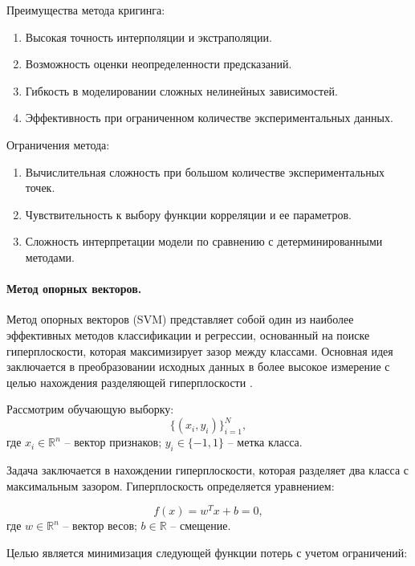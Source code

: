 Преимущества метода кригинга:

\begin{enumerate}
	\item Высокая точность интерполяции и экстраполяции.
	\item Возможность оценки неопределенности предсказаний.
	\item Гибкость в моделировании сложных нелинейных зависимостей.
	\item Эффективность при ограниченном количестве экспериментальных данных.
\end{enumerate}

Ограничения метода:

\begin{enumerate}
	\item Вычислительная сложность при большом количестве экспериментальных точек.
	\item Чувствительность к выбору функции корреляции и ее параметров.
	\item Сложность интерпретации модели по сравнению с детерминированными методами.
\end{enumerate}

\paragraph{Метод опорных векторов.}

Метод опорных векторов (SVM) представляет собой один из наиболее эффективных методов классификации и
регрессии, основанный на поиске гиперплоскости, которая максимизирует зазор между классами.
Основная идея заключается в преобразовании исходных данных в более
высокое измерение с целью нахождения разделяющей гиперплоскости \cite{Jakkula2006}.

Рассмотрим обучающую выборку:
\begin{equation}
	\{(x_i, y_i)\}_{i=1}^N,
\end{equation}
где $x_i \in \mathbb{R}^n$ -- вектор признаков;
$y_i \in \{-1, 1\}$ -- метка класса.

Задача заключается в нахождении гиперплоскости,
которая разделяет два класса с максимальным зазором. Гиперплоскость определяется уравнением:

\begin{equation}
	f(x) = w^T x + b = 0,
\end{equation}
где $w \in \mathbb{R}^n$ -- вектор весов;
$b \in \mathbb{R}$ -- смещение.

Целью является минимизация следующей функции потерь с учетом ограничений:

